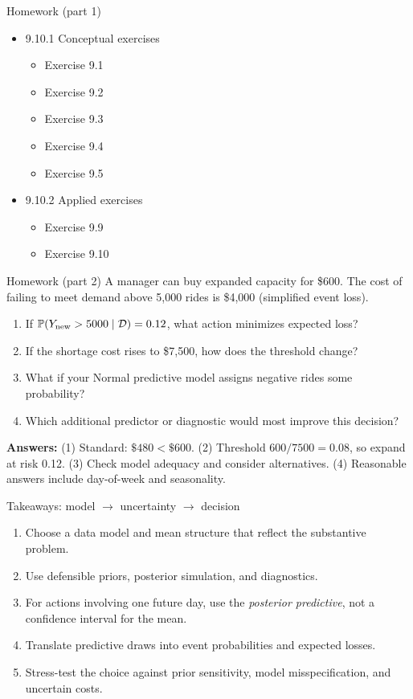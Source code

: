 \documentclass[aspectratio=43,11pt]{beamer}
\newcommand{\Prob}{\mathbb{P}}
\newcommand{\dd}{\mathcal D}
\begin{document}
\begin{frame}{Homework (part 1)}
\begin{itemize}
\item[] 9.10.1 Conceptual exercises
\begin{itemize}
\item Exercise 9.1
\item Exercise 9.2
\item Exercise 9.3
\item Exercise 9.4
\item Exercise 9.5
\end{itemize}
\item[] 9.10.2 Applied exercises
\begin{itemize}
\item Exercise 9.9
\item Exercise 9.10
\end{itemize}
\end{itemize}
\end{frame}

\begin{frame}{Homework (part 2)}
A manager can buy expanded capacity for \$600. The cost of failing to meet demand above 5,000 rides is \$4,000 (simplified event loss).
\begin{enumerate}
\item If $\Prob(Y_{\rm new}>5000\mid\dd)=0.12$, what action minimizes expected loss?
\item If the shortage cost rises to \$7,500, how does the threshold change?
\item What if your Normal predictive model assigns negative rides some probability?
\item Which additional predictor or diagnostic would most improve this decision?
\end{enumerate}
\par\medskip
\scriptsize \textbf{Answers:} (1) Standard: $\$480<\$600$. (2) Threshold $600/7500=0.08$, so expand at risk 0.12. (3) Check model adequacy and consider alternatives. (4) Reasonable answers include day-of-week and seasonality.
\end{frame}

\begin{frame}{Takeaways: model $\rightarrow$ uncertainty $\rightarrow$ decision}
\begin{enumerate}
\item Choose a data model and mean structure that reflect the substantive problem.
\item Use defensible priors, posterior simulation, and diagnostics.
\item For actions involving one future day, use the \emph{posterior predictive}, not a confidence interval for the mean.
\item Translate predictive draws into event probabilities and expected losses.
\item Stress-test the choice against prior sensitivity, model misspecification, and uncertain costs.
\end{enumerate}
\end{frame}
\end{document}
